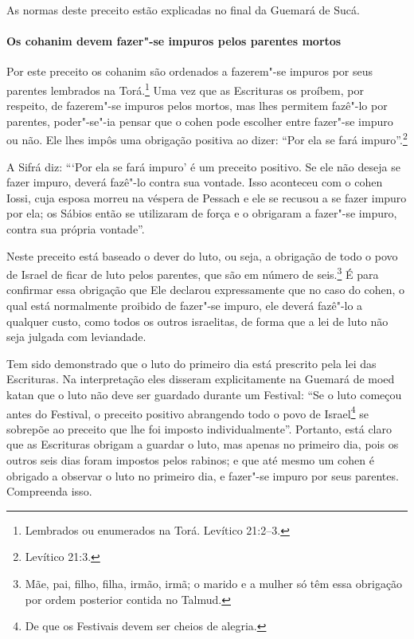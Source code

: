 \begin{multicols}{2}
As normas deste preceito estão explicadas no final da Guemará\starr{} de Sucá\starr.

\paragraph{Os cohanim\starr{} devem fazer"-se impuros pelos parentes mortos}

Por este preceito os cohanim\starr{} são ordenados a fazerem"-se impuros por
seus parentes lembrados na Torá\starr.\footnote{Lembrados ou enumerados na Torá\starr. Levítico 21:2--3.} Uma vez que as
Escrituras os proíbem, por respeito, de fazerem"-se impuros pelos
mortos, mas lhes permitem fazê"-lo por parentes, poder"-se"-ia pensar que o
cohen\starr{} pode escolher entre fazer"-se impuro ou não. Ele lhes impôs uma
obrigação positiva ao dizer: ``Por ela se fará impuro''.\footnote{Levítico 21:3.}

A Sifrá\starr{} diz: ```Por ela se fará impuro' é um preceito positivo. Se ele
não deseja se fazer impuro, deverá fazê"-lo contra sua vontade. Isso
aconteceu com o cohen\starr{} Iossi\starr, cuja esposa morreu na véspera de
Pessach\starr{} e ele se recusou a se fazer impuro por ela; os Sábios então
se utilizaram de força e o obrigaram a fazer"-se impuro, contra sua
própria vontade''.

Neste preceito está baseado o dever do luto, ou seja, a obrigação de
todo o povo de Israel de ficar de luto pelos parentes, que são em número
de seis.\footnote{Mãe, pai, filho, filha, irmão, irmã; o marido e a mulher só têm essa
  obrigação por ordem posterior contida no Talmud\starr.} É para confirmar essa obrigação que Ele
declarou expressamente que no caso do cohen\starr, o qual está normalmente proibido de fazer"-se impuro, ele deverá fazê"-lo a qualquer custo, como todos os outros israelitas, de forma que a lei de luto não seja julgada com leviandade.

Tem sido demonstrado que o luto do primeiro dia está prescrito pela lei
das Escrituras. Na interpretação eles disseram explicitamente na Guemará\starr{}
de moed katan\starr{} que o luto não deve ser guardado durante um Festival: ``Se
o luto começou antes do Festival, o preceito positivo abrangendo todo o
povo de Israel\footnote{De que os Festivais devem ser cheios de alegria.} se sobrepõe ao preceito que lhe foi
imposto individualmente''. Portanto, está claro que as Escrituras obrigam a guardar o luto, mas apenas no primeiro dia, pois os outros seis dias foram impostos pelos rabinos; e que
até mesmo um cohen\starr{} é obrigado a observar o luto no primeiro dia, e
fazer"-se impuro por seus parentes. Compreenda isso.


\end{multicols}

